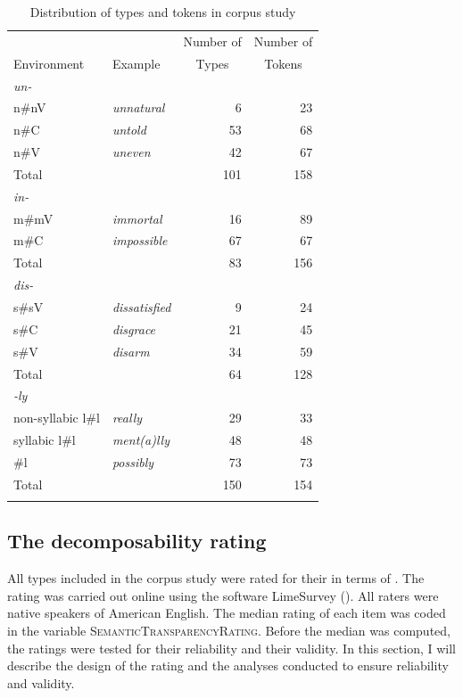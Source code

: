 \begin{table}
	\caption{Distribution of types and tokens in corpus study\label{tbl:distribution of types and tokens in corpus}}
	\begin{tabular}{llrr}
        \lsptoprule
                        &         &  Number of & Number of\\
            Environment & Example &  \multicolumn{1}{c}{Types} & \multicolumn{1}{c}{Tokens}\\\midrule	
			\multicolumn{4}{l}{\itshape un-}\\\midrule
			n\#nV&\textit{unnatural} & 6 & 23\\ 
			n\#C&\textit{untold} & 53 & 68\\ 
			n\#V&\textit{uneven} & 42 & 67\\
			Total&  & 101 & 158\\\midrule
			\multicolumn{4}{l}{\itshape in-}\\\midrule 
			m\#mV&\textit{immortal} & 16 & 89\\ 
			m\#C&\textit{impossible} & 67 & 67\\   
			Total&  & 83 & 156\\\midrule
			\multicolumn{4}{l}{\itshape dis-}\\\midrule   	
			s\#sV&\textit{dissatisfied} & 9 & 24\\ 
			s\#C&\textit{disgrace} & 21 & 45\\ 
			s\#V&\textit{disarm} & 34 & 59\\
			Total&  & 64 & 128\\\midrule
			\multicolumn{4}{l}{\itshape -ly}\\\midrule   	
			non-\is{syllabicity}syllabic l\#l &\textit{really} & 29  & 33 \\ 
			\is{syllabicity}syllabic 	l\#l &\textit{ment(a)lly} & 48 & 48 \\ 
			\#l &\textit{possibly} & 73 & 73\\
			Total&  & 150  & 154\\ 	
			\lspbottomrule                                                                                
		\end{tabular}
\end{table}

\subsection{The decomposability rating} \label{decomposability rating corpus}
All types included in the corpus study were rated for their  in terms of . The rating was carried out online using the software LimeSurvey (\citealt{LimeSurveyProjectTeam.2015}). All raters were native speakers of American English. The median rating of each item was coded in the variable  \textsc{SemanticTransparencyRating}. Before the median was computed, the ratings were tested for their reliability and their validity. In this section, I will describe the design of the rating and the analyses conducted to ensure reliability and validity. 

